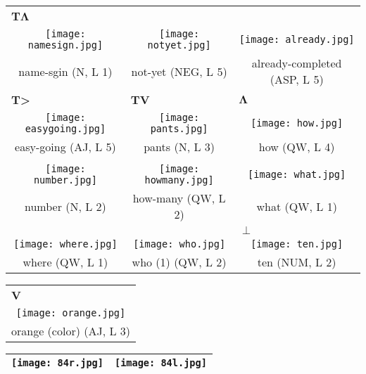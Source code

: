 \documentclass{tufte-book}
\newcommand{\sansnormal}{\sffamily\selectfont}
\begin{document}
\begin{fullwidth}
\begin{table*}[h!]
\begin{tabular}{ccc}
\multicolumn{1}{l}{{\sansnormal\textbf{T}}$\mathbf\Lambda$}&&  \\
\texttt{[image: namesign.jpg]}&\texttt{[image: notyet.jpg]}&\texttt{[image: already.jpg]}\\
   name-sgin (N, L 1)&not-yet (NEG, L 5) & already-completed (ASP, L 5)\\
\multicolumn{1}{l}{{\sansnormal\textbf{T}}\textbf{>}}&\multicolumn{1}{l}{{\sansnormal\textbf{TV}}}&\multicolumn{1}{l}{$\mathbf\Lambda$}  \\
  \texttt{[image: easygoing.jpg]}&\texttt{[image: pants.jpg]}&\texttt{[image: how.jpg]}\\
  easy-going (AJ, L 5) & pants (N, L 3)& how (QW, L 4)\\
  &&\\
   \texttt{[image: number.jpg]}&\texttt{[image: howmany.jpg]}&\texttt{[image: what.jpg]}\\
  number (N, L 2) & how-many (QW, L 2)& what (QW, L 1)\\ 
   &&\multicolumn{1}{l}{$\pmb\perp$}\\
   \texttt{[image: where.jpg]}&\texttt{[image: who.jpg]}&\texttt{[image: ten.jpg]}\\
  where (QW, L 1) & who (1) (QW, L 2)& ten (NUM, L 2)\\ 
   
   
  \end{tabular}
\end{table*} 
\newpage
\begin{table*}[h!]
\begin{tabular}{c}
\multicolumn{1}{l}{\sansnormal\textbf{V}}\\
 \texttt{[image: orange.jpg]}\\
 orange (color) (AJ, L 3)\\
  \end{tabular}
\end{table*} 

  \begin{table}[h!]
\begin{tabular}{|c|c|}
\hline
\texttt{[image: 84r.jpg]} & \texttt{[image: 84l.jpg]}\\
\hline
\end{tabular}
\label{page:84}
\end{table}


\end{fullwidth}
\end{document}
